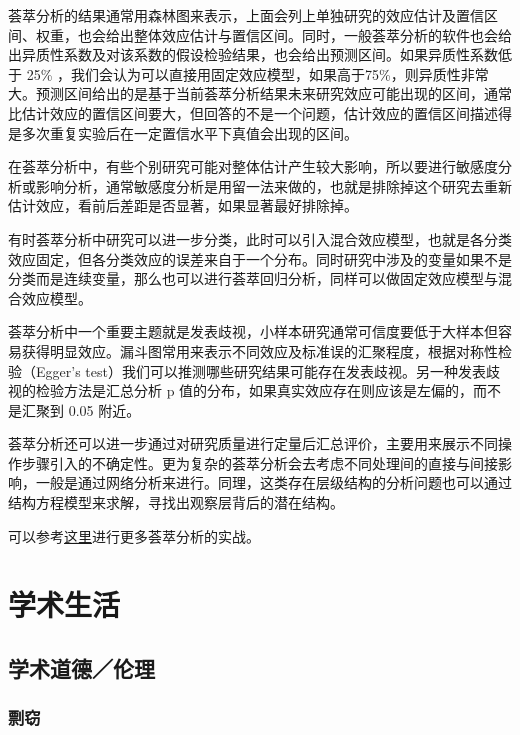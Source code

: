 \documentclass[]{tufte-book}
\begin{document}
荟萃分析的结果通常用森林图来表示，上面会列上单独研究的效应估计及置信区间、权重，也会给出整体效应估计与置信区间。同时，一般荟萃分析的软件也会给出异质性系数及对该系数的假设检验结果，也会给出预测区间。如果异质性系数低于 25\% ，我们会认为可以直接用固定效应模型，如果高于75\%，则异质性非常大。预测区间给出的是基于当前荟萃分析结果未来研究效应可能出现的区间，通常比估计效应的置信区间要大，但回答的不是一个问题，估计效应的置信区间描述得是多次重复实验后在一定置信水平下真值会出现的区间。

在荟萃分析中，有些个别研究可能对整体估计产生较大影响，所以要进行敏感度分析或影响分析，通常敏感度分析是用留一法来做的，也就是排除掉这个研究去重新估计效应，看前后差距是否显著，如果显著最好排除掉。

有时荟萃分析中研究可以进一步分类，此时可以引入混合效应模型，也就是各分类效应固定，但各分类效应的误差来自于一个分布。同时研究中涉及的变量如果不是分类而是连续变量，那么也可以进行荟萃回归分析，同样可以做固定效应模型与混合效应模型。

荟萃分析中一个重要主题就是发表歧视，小样本研究通常可信度要低于大样本但容易获得明显效应。漏斗图常用来表示不同效应及标准误的汇聚程度，根据对称性检验（Egger's test）我们可以推测哪些研究结果可能存在发表歧视。另一种发表歧视的检验方法是汇总分析 p 值的分布，如果真实效应存在则应该是左偏的，而不是汇聚到 0.05 附近。

荟萃分析还可以进一步通过对研究质量进行定量后汇总评价，主要用来展示不同操作步骤引入的不确定性。更为复杂的荟萃分析会去考虑不同处理间的直接与间接影响，一般是通过网络分析来进行。同理，这类存在层级结构的分析问题也可以通过结构方程模型来求解，寻找出观察层背后的潜在结构。

可以参考\href{https://bookdown.org/MathiasHarrer/Doing_Meta_Analysis_in_R/}{这}\href{https://ebmh.bmj.com/content/ebmental/22/4/153.full.pdf}{里}进行更多荟萃分析的实战。

\hypertarget{life}{%
\chapter{学术生活}\label{life}}

\hypertarget{ux5b66ux672fux9053ux5fb7ux4f26ux7406}{%
\section{学术道德／伦理}\label{ux5b66ux672fux9053ux5fb7ux4f26ux7406}}

\hypertarget{ux527dux7a83}{%
\subsection{剽窃}\label{ux527dux7a83}}
\end{document}
